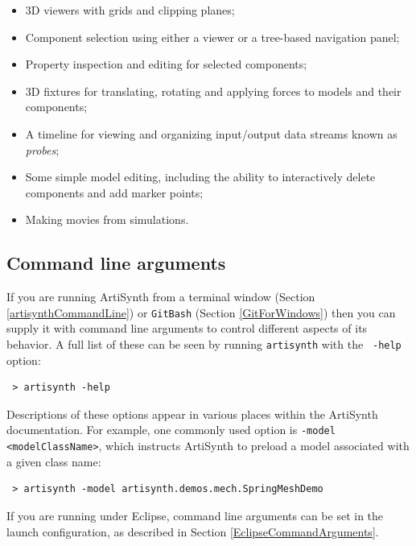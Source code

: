 \begin{itemize}

\item 3D viewers with grids and clipping planes;

\item Component selection using either a viewer or
a tree-based navigation panel;

\item Property inspection and editing for selected components;

\item 3D fixtures for translating, rotating and
applying forces to models and their components;

\item A timeline for viewing and organizing input/output data streams
known as {\it probes};

\item Some simple model editing, including the ability to interactively
delete components and add marker points;

\item Making movies from simulations.

\end{itemize}

\subsection{Command line arguments}
\label{CommandLineArguments}

If you are running ArtiSynth from a terminal window
(Section \ref{artisynthCommandLine})
\ifWindows
or {\tt GitBash} (Section \ref{GitForWindows})
\fi
then you can supply it with
command line arguments to control different aspects of its behavior.
A full list of these can be seen by running {\tt artisynth} with the {\tt
-help} option:
\begin{verbatim}
 > artisynth -help
\end{verbatim}
Descriptions of these options appear in various places within the
ArtiSynth documentation. For example, one commonly used option is
{\tt -model <modelClassName>}, which instructs ArtiSynth to preload a
model associated with a given class name:
\begin{verbatim}
 > artisynth -model artisynth.demos.mech.SpringMeshDemo
\end{verbatim}

If you are running under Eclipse, command line arguments can be set in
the launch configuration, as described in
Section \ref{EclipseCommandArguments}.

